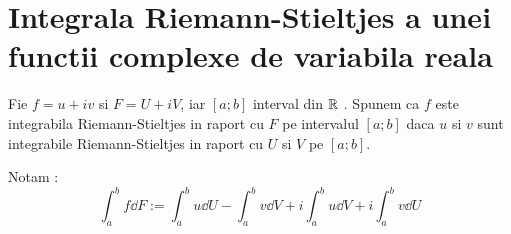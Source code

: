 \section{Integrala Riemann-Stieltjes a unei functii complexe de variabila reala}

\begin{definition}
    Fie $f=u+iv$ si $F=U+iV$, iar $[a;b]$ interval din $\mathbb{R}$ . Spunem ca $f$ este integrabila
    Riemann-Stieltjes in raport cu $F$ pe intervalul $[a;b]$ daca $u$ si $v$ sunt integrabile
    Riemann-Stieltjes in raport cu $U$ si $V$ pe $[a;b]$.

    Notam :
    \begin{equation}
        \int_a^b f \dd F := \int_a^b u \dd U - \int_a^b v \dd V + i\int_a^b u \dd V + i\int_a^b v \dd U
    \end{equation}
\end{definition}

